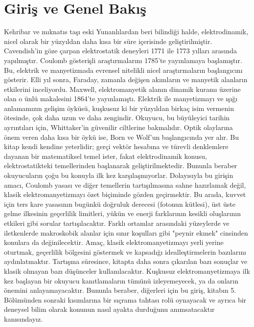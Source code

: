 \setcounter{chapter}{-1}
\cleardoublepage
{}
\chapter{Giriş ve Genel Bakış}

Kehribar ve mıknatıs taşı eski Yunanlılardan beri bilindiği halde, elektrodinamik, nicel olarak bir yüzyıldan daha kısa bir süre içerisinde geliştirilmiştir. Cavendish'in göze çarpan elektrostatik deneyleri 1771 ile 1773 yılları arasında yapılmıştır. Coulomb gösterişli araştırmalarını 1785’te yayınlamaya başlamıştır. Bu, elektrik ve manyetizmada evrensel nitelikli nicel araştırmaların başlangıcını gösterir. Elli yıl sonra, Faraday, zamanla değişen akımların ve manyetik alanların etkilerini inceliyordu. Maxwell, elektromanyetik alanın dinamik kuramı üzerine olan o ünlü makalesini 1864’te yayınlamıştı. Elektrik ile manyetizmayı ve ışığı anlamamızın gelişim öyküsü, kuşkusuz ki bir yüzyıldan birkaç isim vermenin ötesinde, çok daha uzun ve daha zengindir. Okuyucu, bu büyüleyici tarihin ayrıntıları için, Whittaker'in güvenilir ciltlerine bakmalıdır. Optik olaylarına önem veren daha kısa bir öykü ise, Born ve Wolf'un başlangıcında yer alır. Bu kitap kendi kendine yeterlidir; gerçi vektör hesabına ve türevli denklemlere dayanan bir matematiksel temel ister, fakat elektrodinamik konusu, elektrostatikteki temellerinden başlanarak geliştirilmektedir. Bununla beraber okuyucuların çoğu bu konuyla ilk kez karşılaşmıyorlar. Dolayısıyla bu girişin amacı, Coulomb yasası ve diğer temellerin tartışılmasına sahne hazırlamak değil, klasik elektromanyetizmayı özet biçiminde gözden geçirmektir. Bu arada, kuvvet için ters kare yasasının bugünkü doğruluk derecesi (fotonun kütlesi), üst üste gelme ilkesinin geçerlilik limitleri, yükün ve enerji farklarının kesikli oluşlarının etkileri gibi sorular tartışılacaktır. Farklı ortamlar arasındaki yüzeylerde ve iletkenlerde makroskobik alanlar için sınır koşulları gibi "peynir ekmek" cinsinden konulara da değinilecektir. Amaç, klasik elektromanyetizmayı yerli yerine oturtmak, geçerlilik bölgesini göstermek ve kapsadığı idealleştirmelerin bazılarını aydınlatmaktır. Tartışma süresince, kitapta daha sonra çıkarılan bazı sonuçlar ve klasik olmayan bazı düşünceler kullanılacaktır. Kuşkusuz elektromanyetizmaya ilk kez başlayan bir okuyucu kanıtlamaların tümünü izleyemeyecek, ya da onların önemini anlayamayacaktır. Bununla beraber, diğerleri için bu giriş, kitabın 5. Bölümünden sonraki kısımlarına bir sıçrama tahtası rolü oynayacak ve ayrıca bir deneysel bilim olarak konunun nasıl ayakta durduğunu anımsatacaktır kanısındayız.

